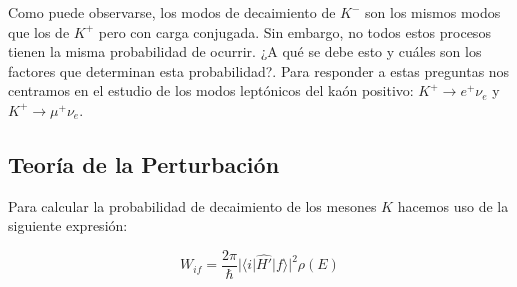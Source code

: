Como puede observarse, los modos de decaimiento de $K^{-}$ son los mismos modos que los de $K^{+}$ pero con carga conjugada. Sin embargo, no todos estos procesos tienen la misma probabilidad de ocurrir. ¿A qué se debe esto y cuáles son los factores que determinan esta probabilidad?. Para responder a estas preguntas nos centramos en el estudio de los modos leptónicos del kaón positivo: $K^{+} \rightarrow e^{+}\nu_{e}$ y $K^{+} \rightarrow \mu^{+}\nu_{e}$.


\subsection{Teoría de la Perturbación}\label{sec:perturbation_theory}
Para calcular la probabilidad de decaimiento de los mesones $K$ hacemos uso de la siguiente expresión:

\begin{equation}
W_{if}= \dfrac{2\pi }{\hbar }\left| \langle i\right| \widehat{H'}| f\rangle| ^{2}\rho \left( E\right)
\end{equation}